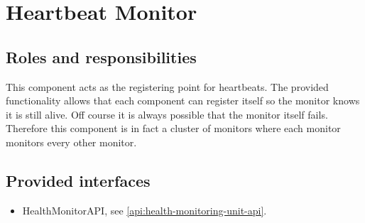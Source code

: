 \section{Heartbeat Monitor}
\label{element:heartbeat-monitor}

\subsection{Roles and responsibilities}

\npar This component acts as the registering point for heartbeats. The provided
functionality allows that each component can register itself so the monitor
knows it is still alive. Off course it is always possible that the monitor
itself fails. Therefore this component is in fact a cluster of monitors where
each monitor monitors every other monitor.

\subsection{Provided interfaces}

\begin{itemize}
  \item HealthMonitorAPI, see \ref{api:health-monitoring-unit-api}.
\end{itemize}



